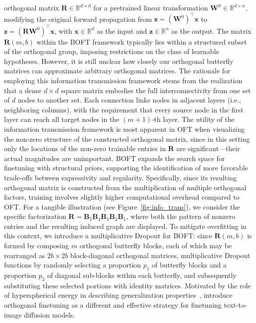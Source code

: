orthogonal matrix $\bm{R}\in\mathbb{R}^{d\times d}$ for a pretrained linear transformation $\bm{W}^0\in\mathbb{R}^{d\times n}$, modifying the original forward propagation from $\bm{z}=(\bm{W}^0)^\top\bm{x}$ to $\bm{z}=(\bm{R}\bm{W}^0)^\top\bm{x}$, with $\bm{x}\in\mathbb{R}^{d}$ as the input and $\bm{z}\in\mathbb{R}^{n}$ as the output. The matrix $\bm{R}(m,b)$ within the BOFT framework typically lies within a structured subset of the orthogonal group, imposing restrictions on the class of learnable hypotheses. However, it is still unclear how closely our orthogonal butterfly matrices can approximate arbitrary orthogonal matrices. The rationale for employing this information transmission framework stems from the realization that a dense $d \times d$ square matrix embodies the full interconnectivity from one set of $d$ nodes to another set. Each connection links nodes in adjacent layers (i.e., neighboring columns), with the requirement that every source node in the first layer can reach all target nodes in the $(m+1)$-th layer. The utility of the information transmission framework is most apparent in OFT when visualizing the non-zero structure of the constructed orthogonal matrix, since in this setting only the locations of the non-zero trainable entries in $\bm{R}$ are significant—their actual magnitudes are unimportant. BOFT expands the search space for finetuning with structural priors, supporting the identification of more favorable trade-offs between expressivity and regularity. Specifically, since its resulting orthogonal matrix is constructed from the multiplication of multiple orthogonal factors, training involves slightly higher computational overhead compared to OFT. For a tangible illustration (see Figure~\ref{fig:info_trans}), we consider the specific factorization $\bm{R}=\bm{B}_5\bm{B}_4\bm{B}_3\bm{B}_2\bm{B}_1$, where both the pattern of nonzero entries and the resulting induced graph are displayed. To mitigate overfitting in this context, we introduce a multiplicative Dropout for BOFT: since $\bm{R}(m,b)$ is formed by composing $m$ orthogonal butterfly blocks, each of which may be rearranged as $2b\times 2b$ block-diagonal orthogonal matrices, multiplicative Dropout functions by randomly selecting a proportion $p_1$ of butterfly blocks and a proportion $p_2$ of diagonal sub-blocks within each butterfly, and subsequently substituting these selected portions with identity matrices. Motivated by the role of hyperspherical energy in describing generalization properties~\cite{liu2018learning,liu2021orthogonal}, \cite{qiu2023controlling} introduce orthogonal finetuning as a different and effective strategy for finetuning text-to-image diffusion models. 
